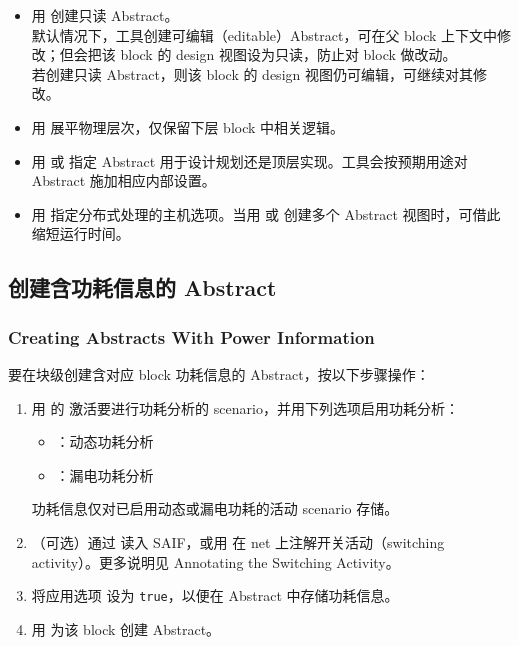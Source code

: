 \begin{itemize}
  \item 用  创建只读 Abstract。\\
默认情况下，工具创建可编辑（editable）Abstract，可在父 block 上下文中修改；但会把该 block 的 design 视图设为只读，防止对 block 做改动。\\
若创建只读 Abstract，则该 block 的 design 视图仍可编辑，可继续对其修改。

  \item 用  展平物理层次，仅保留下层 block 中相关逻辑。

  \item 用  或  指定 Abstract 用于设计规划还是顶层实现。工具会按预期用途对 Abstract 施加相应内部设置。

  \item 用  指定分布式处理的主机选项。当用  或  创建多个 Abstract 视图时，可借此缩短运行时间。
\end{itemize}

\subsection{创建含功耗信息的 Abstract}
\subsubsection*{Creating Abstracts With Power Information}

要在块级创建含对应 block 功耗信息的 Abstract，按以下步骤操作：
\begin{enumerate}
  \item 用  的  激活要进行功耗分析的 scenario，并用下列选项启用功耗分析：
  \begin{itemize}
    \item {}：动态功耗分析
    \item {}：漏电功耗分析
  \end{itemize}
功耗信息仅对已启用动态或漏电功耗的活动 scenario 存储。
  \item （可选）通过  读入 SAIF，或用  在 net 上注解开关活动（switching activity）。更多说明见 Annotating the Switching Activity。
  \item 将应用选项  设为 \texttt{true}，以便在 Abstract 中存储功耗信息。
  \item 用  为该 block 创建 Abstract。
\end{enumerate}

